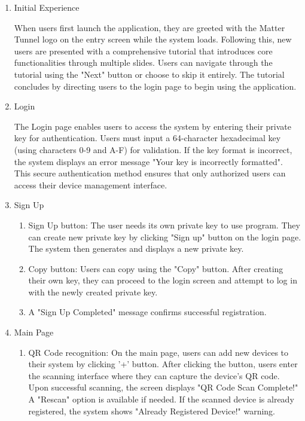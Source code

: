 \documentclass[conference]{IEEEtran}
\begin{document}
\begin{enumerate}[itemsep=2ex, parsep=1ex]
    \item{Initial Experience}
        
        When users first launch the application, they are greeted with the Matter Tunnel logo on the entry screen while the system loads. Following this, new users are presented with a comprehensive tutorial that introduces core functionalities through multiple slides. Users can navigate through the tutorial using the "Next" button or choose to skip it entirely. The tutorial concludes by directing users to the login page to begin using the application.
        
    \item{Login}
        
        The Login page enables users to access the system by entering their private key for authentication. Users must input a 64-character hexadecimal key (using characters 0-9 and A-F) for validation. If the key format is incorrect, the system displays an error message "Your key is incorrectly formatted". This secure authentication method ensures that only authorized users can access their device management interface.
        
    \item{Sign Up}
        \begin{enumerate}
            \item Sign Up button: The user needs its own private key to use program. They can create new private key by clicking "Sign up" button on the login page. The system then generates and displays a new private key.
            
            \item Copy button: Users can copy using the "Copy" button. After creating their own key, they can proceed to the login screen and attempt to log in with the newly created private key.
            
            \item A "Sign Up Completed" message confirms successful registration.
        \end{enumerate}
        
    \item{Main Page}
        \begin{enumerate}
            \item QR Code recognition: On the main page, users can add new devices to their system by clicking '+' button. After clicking the button, users enter the scanning interface where they can capture the device's QR code. Upon successful scanning, the screen displays "QR Code Scan Complete!" A "Rescan" option is available if needed. If the scanned device is already registered, the system shows "Already Registered Device!" warning.
            

\end{enumerate}
\end{enumerate}
\end{document}
